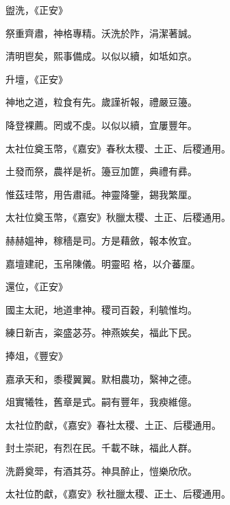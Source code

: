\begin{pinyinscope}
 盥洗，《正安》



 祭重齊肅，神格專精。沃洗於阼，涓潔著誠。



 清明鬯矣，熙事備成。以似以續，如坻如京。



 升壇，《正安》



 神地之道，粒食有先。歲謹祈報，禮嚴豆籩。



 降登裸薦。罔或不虔。以似以續，宜屢豐年。



 太社位奠玉幣，《嘉安》春秋太稷、土正、后稷通用。



 土發而祭，農祥是祈。籩豆加篚，典禮有彞。



 惟茲珪幣，用告肅祗。神靈降鑒，錫我繁厘。



 太社位奠玉幣，《嘉安》秋臘太稷、土正、后稷通用。



 赫赫媼神，稼穡是司。方是藉斂，報本攸宜。



 嘉壇建祀，玉帛陳儀。明靈昭
 格，以介蕃厘。



 還位，《正安》



 國主太祀，地道聿神。稷司百穀，利毓惟均。



 練日新吉，粢盛苾芬。神燕娭矣，福此下民。



 捧俎，《豐安》



 嘉承天和，黍稷翼翼。默相農功，繄神之德。



 俎實犧牲，舊章是式。嗣有豐年，我瘐維億。



 太社位酌獻，《嘉安》春社太稷、土正、后稷通用。



 封土崇祀，有烈在民。千載不昧，福此人群。



 洗爵奠斝，有酒其芬。神具醉止，愷樂欣欣。



 太社位酌獻，《嘉安》秋社臘太稷、正土、后稷通用。




\end{pinyinscope}
